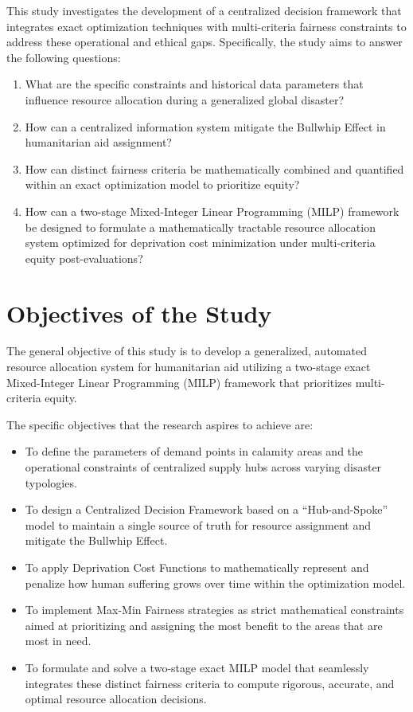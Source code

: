 This study investigates the development of a centralized decision framework that integrates exact optimization techniques with multi-criteria fairness constraints to address these operational and ethical gaps. Specifically, the study aims to answer the following questions:
\begin{enumerate}
\item What are the specific constraints and historical data parameters that influence resource allocation during a generalized global disaster?
\item How can a centralized information system mitigate the Bullwhip Effect in humanitarian aid assignment?
\item How can distinct fairness criteria be mathematically combined and quantified within an exact optimization model to prioritize equity?
\item How can a two-stage Mixed-Integer Linear Programming (MILP) framework be designed to formulate a mathematically tractable resource allocation system optimized for deprivation cost minimization under multi-criteria equity post-evaluations?
\end{enumerate}

\section{Objectives of the Study}
The general objective of this study is to develop a generalized, automated resource allocation system for humanitarian aid utilizing a two-stage exact Mixed-Integer Linear Programming (MILP) framework that prioritizes multi-criteria equity.

The specific objectives that the research aspires to achieve are:
\begin{itemize}
\item To define the parameters of demand points in calamity areas and the operational constraints of centralized supply hubs across varying disaster typologies.
\item To design a Centralized Decision Framework based on a ``Hub-and-Spoke'' model to maintain a single source of truth for resource assignment and mitigate the Bullwhip Effect.
\item To apply Deprivation Cost Functions to mathematically represent and penalize how human suffering grows over time within the optimization model.
\item To implement Max-Min Fairness strategies as strict mathematical constraints aimed at prioritizing and assigning the most benefit to the areas that are most in need.
\item To formulate and solve a two-stage exact MILP model that seamlessly integrates these distinct fairness criteria to compute rigorous, accurate, and optimal resource allocation decisions.
\end{itemize}

